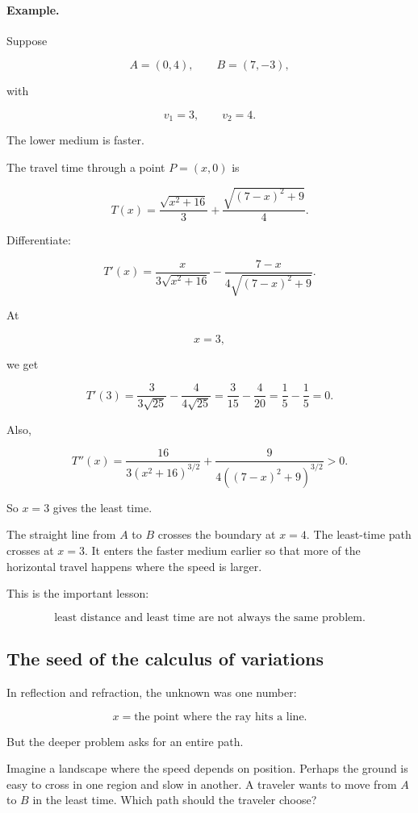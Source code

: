 \paragraph{Example.}
Suppose

\[
A=(0,4),
\qquad
B=(7,-3),
\]

with

\[
v_1=3,
\qquad
v_2=4.
\]

The lower medium is faster.

The travel time through a point \(P=(x,0)\) is

\[
T(x)
=
\frac{\sqrt{x^2+16}}{3}
+
\frac{\sqrt{(7-x)^2+9}}{4}.
\]

Differentiate:

\[
T'(x)
=
\frac{x}{3\sqrt{x^2+16}}
-
\frac{7-x}{4\sqrt{(7-x)^2+9}}.
\]

At

\[
x=3,
\]

we get

\[
T'(3)
=
\frac{3}{3\sqrt{25}}
-
\frac{4}{4\sqrt{25}}
=
\frac{3}{15}-\frac{4}{20}
=
\frac15-\frac15
=
0.
\]

Also,

\[
T''(x)
=
\frac{16}{3(x^2+16)^{3/2}}
+
\frac{9}{4((7-x)^2+9)^{3/2}}
>0.
\]

So \(x=3\) gives the least time.

The straight line from \(A\) to \(B\) crosses the boundary at \(x=4\).  The least-time
path crosses at \(x=3\).  It enters the faster medium earlier so that more of the
horizontal travel happens where the speed is larger.

This is the important lesson:

\[
\text{least distance and least time are not always the same problem.}
\]

\subsection{The seed of the calculus of variations}
\label{subsec:seed-calculus-variations}

In reflection and refraction, the unknown was one number:

\[
x=\text{the point where the ray hits a line}.
\]

But the deeper problem asks for an entire path.

Imagine a landscape where the speed depends on position.  Perhaps the ground is easy
to cross in one region and slow in another.  A traveler wants to move from \(A\) to
\(B\) in the least time.  Which path should the traveler choose?

